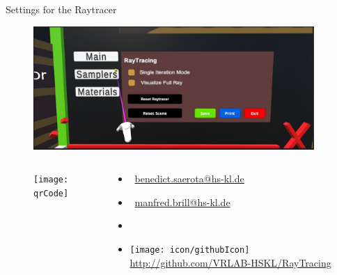 \documentclass[final,hyperref={pdfpagelabels=false}]{beamer}
\begin{document}
\begin{frame}[t]
\begin{columns}[t]
\begin{column}{0.465\textwidth}
\begin{block}{Settings for the Raytracer}
    \begin{figure}
    	\centering
        \includegraphics[width=0.95\linewidth]{settings}
    \end{figure}
\end{block}

\end{column}


\begin{column}{.025\textwidth}\end{column} %
\end{columns} 

\vspace*{2.0cm}

\begin{columns}[t]

\vspace*{0.2cm}

\begin{column}{0.15\textwidth}



\begin{figure}[h]
\centering
\texttt{[image: qrCode]}
\end{figure}
\end{column}


\begin{column}{0.3\textwidth}
\vspace*{3.0cm}
\begin{itemize}
\item[] \Letter\ \href{benedict.saerota@hs-kl.de}{benedict.saerota@hs-kl.de}
\item[] \Letter\ \href{manfred.brill@hs-kl.de}{manfred.brill@hs-kl.de}
\item[]
\item[] \texttt{[image: icon/githubIcon]} \href{https://github.com/VRLAB-HSKL/RayTracing}{http://github.com/VRLAB-HSKL/RayTracing}
\end{itemize}
\end{column}


\end{columns}
\end{frame}
\end{document}
